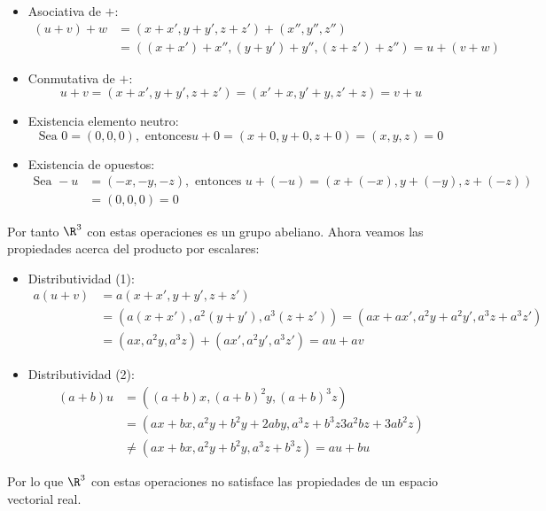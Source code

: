 \begin{ejercicio}
	\begin{itemize}
		\item Asociativa de $+$:
		      \begin{align*}
			      (u+v) + w & = (x + x', y + y', z + z') + (x'',y'',z'') \\&= ((x+x') + x'', (y + y') + y'', (z + z') + z'') = u + (v + w)
		      \end{align*}
		\item Conmutativa de $+$:
		      \begin{equation*}
			      u + v = (x + x', y + y', z + z') = (x' + x, y' + y, z' + z) = v + u
		      \end{equation*}
		\item Existencia elemento neutro:
		      \begin{equation*}
			      \text{Sea } 0 = (0,0,0), \text{ entonces} u + 0 = (x + 0, y + 0, z + 0) = (x,y,z) = 0
		      \end{equation*}
		\item Existencia de opuestos:
		      \begin{align*}
			      \text{Sea } -u & = (-x,-y,-z), \text{ entonces } u + (-u) = (x + (-x), y + (-y), z + (-z)) \\&= (0,0,0) = 0
		      \end{align*}
	\end{itemize}
	Por tanto $\R^3$ con estas operaciones es un grupo abeliano. Ahora veamos las propiedades acerca del producto por escalares:
	\begin{itemize}
		\item Distributividad (1):
		      \begin{align*}
			      a(u+v) & = a(x + x', y + y', z + z') \\&= (a(x + x'), a^2(y + y'), a^3(z + z')) = (ax + ax', a^2y + a^2y', a^3z + a^3z')
			      \\&= (ax, a^2y, a^3z) + (ax', a^2y', a^3z') = au + av
		      \end{align*}
		\item Distributividad (2):
		      \begin{align*}
			      (a+b)u & = ((a+b)x, (a+b)^2y, (a+b)^3z)                     \\&= (ax + bx, a^2y + b^2y + 2aby, a^3z + b^3z 3a^2bz + 3ab^2z) \\
			             & \neq (ax + bx, a^2y + b^2y, a^3z + b^3z) = au + bu
		      \end{align*}
	\end{itemize}
	Por lo que $\R^3$ con estas operaciones no satisface las propiedades de un espacio vectorial real.
\end{ejercicio}
